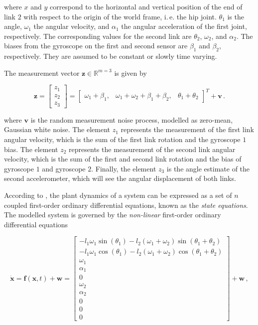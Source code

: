 \noindent
where $x$ and $y$ correspond to the horizontal and vertical position of the end of link $2$ with respect to the origin of the world frame, i.\,e. the hip joint. $\theta_1$ is the angle, $\omega_1$ the angular velocity, and $\alpha_1$ the angular acceleration of the first joint, respectively. The corresponding values for the second link are $\theta_2$, $\omega_2$, and $\alpha_2$. The biases from the gyroscope on the first and second sensor are $\beta_1$ and $\beta_2$, respectively. They are assumed to be constant or slowly time varying.

The measurement vector $\mathbf{z} \in \mathbb{R}^{m=3}$ is given by

\begin{equation} \label{eq:measurement_vector}
  \mathbf{z} = \begin{bmatrix} z_1 \\ z_2 \\ z_3 \end{bmatrix} = \begin{bmatrix}
  	\omega_1 + \beta_1, & \omega_1 + \omega_2 + \beta_1 + \beta_2, & \theta_1 + \theta_2
  \end{bmatrix}^T + \mathbf{v}\,.
\end{equation}
 
\noindent
where $\mathbf{v}$ is the random measurement noise process, modelled as zero-mean, Gaussian white noise. The element $z_1$ represents the measurement of the first link angular velocity, which is the sum of the first link rotation and the gyroscope $1$ bias. The element $z_2$ represents the measurement of the second link angular velocity, which is the sum of the first and second link rotation and the bias of gyroscope $1$ and gyroscope $2$. Finally, the element $z_3$ is the angle estimate of the second accelerometer, which will see the angular displacement of both links.

According to  \citeauthor{rowell2002state} \cite{rowell2002state}, the plant dynamics of a system can be expressed as a set of $n$ coupled first-order ordinary differential equations, known as the \emph{state equations}. The modelled system is governed by the \emph{non-linear} first-order ordinary differential equations

\begin{equation} \label{eq:state_vector_derivative}
  \dot{\mathbf{x}} = \mathbf{f}(\mathbf{x}, t) + \mathbf{w} = \left[\begin{smallmatrix}
  -l_1 \omega_1 \sin(\theta_1)  - l_2 (\omega_1 + \omega_2) \sin(\theta_1 + \theta_2) \\
  -l_1 \omega_1 \cos(\theta_1)  - l_2 (\omega_1 + \omega_2) \cos(\theta_1 + \theta_2) \\ \omega_1 \\ \alpha_1 \\ 0 \\ \omega_2 \\ \alpha_2 \\ 0 \\ 0 \\ 0
  \end{smallmatrix}\right] + \mathbf{w}\,,
\end{equation}

